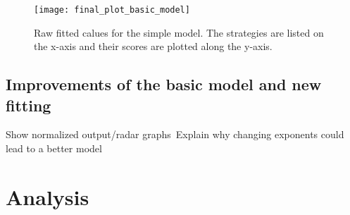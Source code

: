 \begin{figure}[H]
    \centering
    \texttt{[image: final\_plot\_basic\_model]}
    \captionsetup{justification=centering}
    \caption{Raw fitted calues for the simple model. The strategies are listed
    on the x-axis and their scores are plotted along the y-axis. }
    \label{fig:recapTestsPlot}
\end{figure}





\subsection{Improvements of the basic model and new fitting}
Show normalized output/radar graphs\
Explain why changing exponents could lead to a better model

\section{Analysis}


